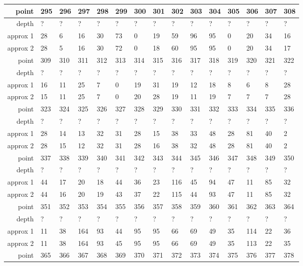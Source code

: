 \begin{center}
\begin{supertabular}{|r|l l l l l l l l l l l l l l|}
\hline
point & 295 & 296 & 297 & 298 & 299 & 300 & 301 & 302 & 303 & 304 & 305 & 306 & 307 & 308 \\
\hline
depth & ? & ? & ? & ? & ? & ? & ? & ? & ? & ? & ? & ? & ? & ? \\
approx 1 & 28 & 6 & 16 & 30 & 73 & 0 & 19 & 59 & 96 & 95 & 0 & 20 & 34 & 16 \\
approx 2 & 28 & 5 & 16 & 30 & 72 & 0 & 18 & 60 & 95 & 95 & 0 & 20 & 34 & 17 \\
\hline
point & 309 & 310 & 311 & 312 & 313 & 314 & 315 & 316 & 317 & 318 & 319 & 320 & 321 & 322 \\
\hline
depth & ? & ? & ? & ? & ? & ? & ? & ? & ? & ? & ? & ? & ? & ? \\
approx 1 & 16 & 11 & 25 & 7 & 0 & 19 & 31 & 19 & 12 & 18 & 8 & 6 & 8 & 28 \\
approx 2 & 15 & 11 & 25 & 7 & 0 & 20 & 28 & 19 & 11 & 19 & 7 & 7 & 7 & 28 \\
\hline
point & 323 & 324 & 325 & 326 & 327 & 328 & 329 & 330 & 331 & 332 & 333 & 334 & 335 & 336 \\
\hline
depth & ? & ? & ? & ? & ? & ? & ? & ? & ? & ? & ? & ? & ? & ? \\
approx 1 & 28 & 14 & 13 & 32 & 31 & 28 & 15 & 38 & 33 & 48 & 28 & 81 & 40 & 2 \\
approx 2 & 28 & 15 & 12 & 32 & 31 & 28 & 16 & 38 & 32 & 48 & 28 & 81 & 40 & 2 \\
\hline
point & 337 & 338 & 339 & 340 & 341 & 342 & 343 & 344 & 345 & 346 & 347 & 348 & 349 & 350 \\
\hline
depth & ? & ? & ? & ? & ? & ? & ? & ? & ? & ? & ? & ? & ? & ? \\
approx 1 & 44 & 17 & 20 & 18 & 44 & 36 & 23 & 116 & 45 & 94 & 47 & 11 & 85 & 32 \\
approx 2 & 44 & 16 & 20 & 19 & 43 & 37 & 22 & 115 & 44 & 93 & 47 & 11 & 85 & 32 \\
\hline
point & 351 & 352 & 353 & 354 & 355 & 356 & 357 & 358 & 359 & 360 & 361 & 362 & 363 & 364 \\
\hline
depth & ? & ? & ? & ? & ? & ? & ? & ? & ? & ? & ? & ? & ? & ? \\
approx 1 & 11 & 38 & 164 & 93 & 44 & 95 & 95 & 66 & 69 & 49 & 35 & 114 & 22 & 36 \\
approx 2 & 11 & 38 & 164 & 93 & 45 & 95 & 95 & 66 & 69 & 49 & 35 & 113 & 22 & 35 \\
\hline
point & 365 & 366 & 367 & 368 & 369 & 370 & 371 & 372 & 373 & 374 & 375 & 376 & 377 & 378 \\

\end{supertabular}
\end{center}
